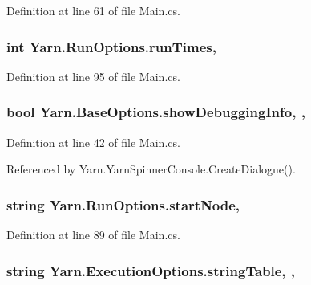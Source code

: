 Definition at line 61 of file Main.\-cs.

\hypertarget{a00142_a525bb1890b29f86002c2f163ace4a3d8}{
\subsubsection[{run\-Times}]{\setlength{\rightskip}{0pt plus 5cm}int Yarn.\-Run\-Options.\-run\-Times\hspace{0.3cm}{\ttfamily [get]}, {\ttfamily [set]}}}\label{a00142_a525bb1890b29f86002c2f163ace4a3d8}


Definition at line 95 of file Main.\-cs.

\hypertarget{a00040_a89964ea17bd19caf00cb5bff563ed01c}{
\subsubsection[{show\-Debugging\-Info}]{\setlength{\rightskip}{0pt plus 5cm}bool Yarn.\-Base\-Options.\-show\-Debugging\-Info\hspace{0.3cm}{\ttfamily [get]}, {\ttfamily [set]}, {\ttfamily [inherited]}}}\label{a00040_a89964ea17bd19caf00cb5bff563ed01c}


Definition at line 42 of file Main.\-cs.



Referenced by Yarn.\-Yarn\-Spinner\-Console.\-Create\-Dialogue().

\hypertarget{a00142_a785bd0f1c8b6674e7a1cfbe38c29b961}{
\subsubsection[{start\-Node}]{\setlength{\rightskip}{0pt plus 5cm}string Yarn.\-Run\-Options.\-start\-Node\hspace{0.3cm}{\ttfamily [get]}, {\ttfamily [set]}}}\label{a00142_a785bd0f1c8b6674e7a1cfbe38c29b961}


Definition at line 89 of file Main.\-cs.

\hypertarget{a00099_a7e43c3b73722956cb0f5d507e4eef527}{
\subsubsection[{string\-Table}]{\setlength{\rightskip}{0pt plus 5cm}string Yarn.\-Execution\-Options.\-string\-Table\hspace{0.3cm}{\ttfamily [get]}, {\ttfamily [set]}, {\ttfamily [inherited]}}}\label{a00099_a7e43c3b73722956cb0f5d507e4eef527}



